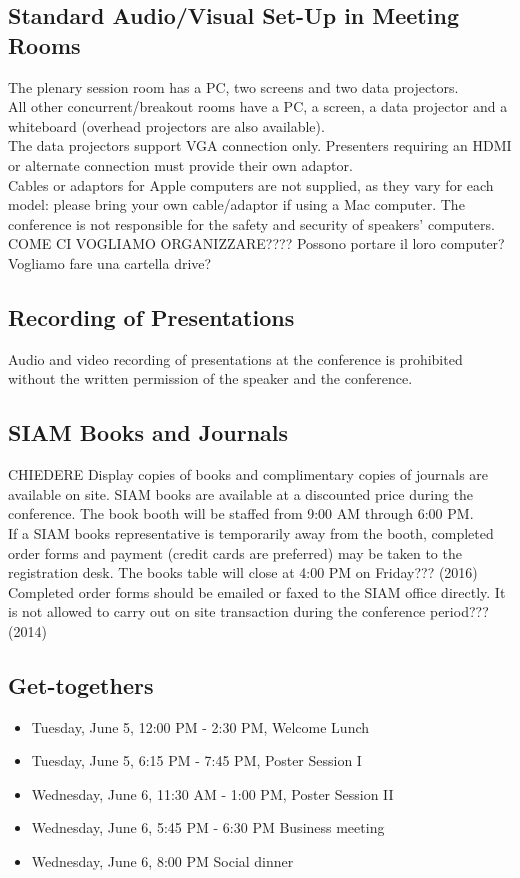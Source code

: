 \begin{multicols}{2}
\subsection*{Standard Audio/Visual Set-Up in Meeting Rooms}
The plenary session room has a PC, two screens and two data projectors.\\ 
All other concurrent/breakout rooms have a PC, a screen, a data projector and a whiteboard (overhead projectors are also available).\\
The data projectors support VGA connection only. Presenters requiring an HDMI or alternate connection must provide their own adaptor.\\
Cables or adaptors for Apple computers are not supplied, as they vary for each model: please bring your own cable/adaptor if using a Mac computer. 
The conference is not responsible for the safety and security of speakers' computers.\\
COME CI VOGLIAMO ORGANIZZARE???? Possono portare il loro computer? Vogliamo fare una cartella drive? 
\subsection*{Recording of Presentations}
Audio and video recording of presentations at the conference is prohibited without the written permission of the speaker and the conference.
\subsection*{SIAM Books and Journals}CHIEDERE
Display copies of books and complimentary copies of journals are available on site. SIAM books are available at a discounted price during the conference. The book booth will be staffed from 9:00 AM through 6:00 PM. \\If a SIAM books representative is temporarily away from the booth, completed order forms and payment (credit cards are preferred) may be taken to the registration desk. The books table will close at 4:00 PM on Friday??? (2016)\\
Completed order forms should be emailed or faxed to the SIAM office directly. It is not allowed to carry out on site transaction during the conference period??? (2014)
\subsection*{Get-togethers}
\begin{itemize}
\item Tuesday, June 5, 12:00 PM - 2:30 PM, Welcome Lunch
\item Tuesday, June 5, 6:15 PM - 7:45 PM, Poster Session I
\item Wednesday, June 6, 11:30 AM - 1:00 PM, Poster Session II
\item Wednesday, June 6, 5:45 PM - 6:30 PM Business meeting
\item Wednesday, June 6, 8:00 PM Social dinner
\end{itemize}

\end{multicols}
